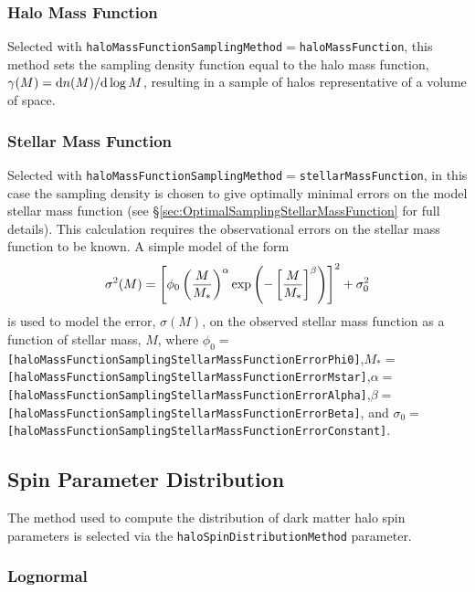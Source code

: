 \subsubsection{Halo Mass Function}

Selected with {\tt haloMassFunctionSamplingMethod}$=${\tt haloMassFunction}, this method sets the sampling density function equal to the halo mass function, $\gamma(M) = {\rm d} n(M)/{\rm d}\log M$, resulting in a sample of halos representative of a volume of space.

\subsubsection{Stellar Mass Function}

Selected with {\tt haloMassFunctionSamplingMethod}$=${\tt stellarMassFunction}, in this case the sampling density is chosen to give optimally minimal errors on the model stellar mass function (see \S\ref{sec:OptimalSamplingStellarMassFunction} for full details). This calculation requires the observational errors on the stellar mass function to be known. A simple model of the form
\begin{equation}
 \sigma^2(M) = \left[\phi_0 \left({M\over M_*}\right)^\alpha \exp\left(-\left[{M\over M_*}\right]^\beta\right)\right]^2 + \sigma_0^2
\end{equation}
is used to model the error, $\sigma(M)$, on the observed stellar mass function as a function of stellar mass, $M$, where $\phi_0=${\tt [haloMassFunctionSamplingStellarMassFunctionErrorPhi0]},$M_*=${\tt [haloMassFunctionSamplingStellarMassFunctionErrorMstar]},$\alpha=${\tt [haloMassFunctionSamplingStellarMassFunctionErrorAlpha]},$\beta=${\tt [haloMassFunctionSamplingStellarMassFunctionErrorBeta]}, and $\sigma_0=${\tt [haloMassFunctionSamplingStellarMassFunctionErrorConstant]}.

\subsection{Spin Parameter Distribution}\label{sec:SpinParameterDistribution}

The method used to compute the distribution of dark matter halo spin parameters is selected via the {\tt haloSpinDistributionMethod} parameter.

\subsubsection{Lognormal}

